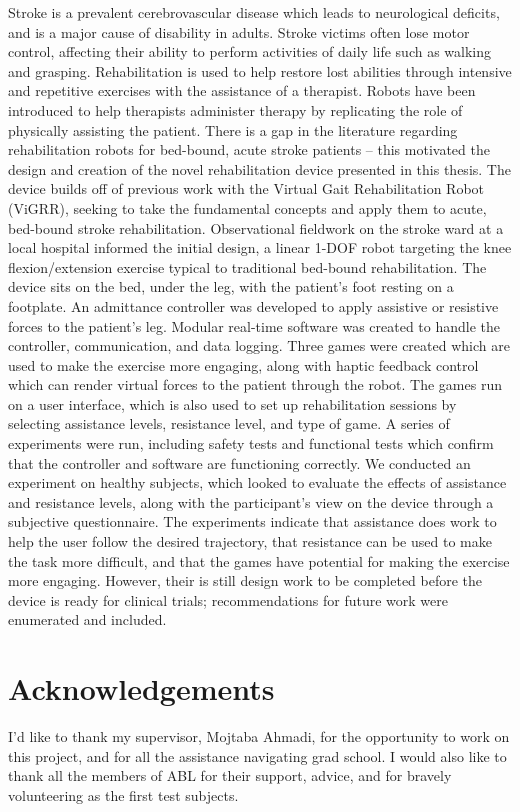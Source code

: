 \documentclass[12pt]{report}
\begin{document}
Stroke is a prevalent cerebrovascular disease which leads to neurological deficits, and is a major cause of disability in adults. Stroke victims often lose motor control, affecting their ability to perform activities of daily life such as walking and grasping. Rehabilitation is used to help restore lost abilities through intensive and repetitive exercises with the assistance of a therapist. Robots have been introduced to help therapists administer therapy by replicating the role of physically assisting the patient. There is a gap in the literature regarding rehabilitation robots for bed-bound, acute stroke patients -- this motivated the design and creation of the novel rehabilitation device presented in this thesis. The device builds off of previous work with the Virtual Gait Rehabilitation Robot (ViGRR), seeking to take the fundamental concepts and apply them to acute, bed-bound stroke rehabilitation. Observational fieldwork on the stroke ward at a local hospital informed the initial design, a linear 1-DOF robot targeting the knee flexion/extension exercise typical to traditional bed-bound rehabilitation. The device sits on the bed, under the leg, with the patient's foot resting on a footplate. An admittance controller was developed to apply assistive or resistive forces to the patient's leg. Modular real-time software was created to handle the controller, communication, and data logging. Three games were created which are used to make the exercise more engaging, along with haptic feedback control which can render virtual forces to the patient through the robot. The games run on a user interface, which is also used to set up rehabilitation sessions by selecting assistance levels, resistance level, and type of game. 
	A series of experiments were run, including safety tests and functional tests which confirm that the controller and software are functioning correctly. We conducted an experiment on healthy subjects, which looked to evaluate the effects of assistance and resistance levels, along with the participant's view on the device through a subjective questionnaire. The experiments indicate that assistance does work to help the user follow the desired trajectory, that resistance can be used to make the task more difficult, and that the games have potential for making the exercise more engaging. However, their is still design work to be completed before the device is ready for clinical trials; recommendations for future work were enumerated and included. 
	


\chapter*{Acknowledgements}
I'd like to thank my supervisor, Mojtaba Ahmadi, for the opportunity to work on this project, and for all the assistance navigating grad school. I would also like to thank all the members of ABL for their support, advice, and for bravely volunteering as the first test subjects. 
	
\end{document}

